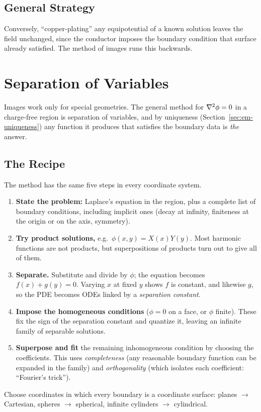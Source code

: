 \subsection{General Strategy}

Conversely, ``copper-plating'' any equipotential of a known solution leaves the field unchanged, since the conductor imposes the boundary condition that surface already satisfied. The method of images runs this backwards.

\section{Separation of Variables}
\label{sec:em-separation}

Images work only for special geometries. The general method for $\laplacian\phi=0$ in a charge-free region is separation of variables, and by uniqueness (Section~\ref{sec:em-uniqueness}) any function it produces that satisfies the boundary data is \emph{the} answer.

\subsection{The Recipe}

The method has the same five steps in every coordinate system.
\begin{enumerate}
    \item \textbf{State the problem:} Laplace's equation in the region, plus a complete list of boundary conditions, including implicit ones (decay at infinity, finiteness at the origin or on the axis, symmetry).
    \item \textbf{Try product solutions,} e.g.\ $\phi(x,y)=X(x)Y(y)$. Most harmonic functions are not products, but superpositions of products turn out to give all of them.
    \item \textbf{Separate.} Substitute and divide by $\phi$; the equation becomes $f(x)+g(y)=0$. Varying $x$ at fixed $y$ shows $f$ is constant, and likewise $g$, so the PDE becomes ODEs linked by a \emph{separation constant}.
    \item \textbf{Impose the homogeneous conditions} ($\phi=0$ on a face, or $\phi$ finite). These fix the sign of the separation constant and quantize it, leaving an infinite family of separable solutions.
    \item \textbf{Superpose and fit} the remaining inhomogeneous condition by choosing the coefficients. This uses \emph{completeness} (any reasonable boundary function can be expanded in the family) and \emph{orthogonality} (which isolates each coefficient: ``Fourier's trick'').
\end{enumerate}
Choose coordinates in which every boundary is a coordinate surface: planes $\to$ Cartesian, spheres $\to$ spherical, infinite cylinders $\to$ cylindrical.

